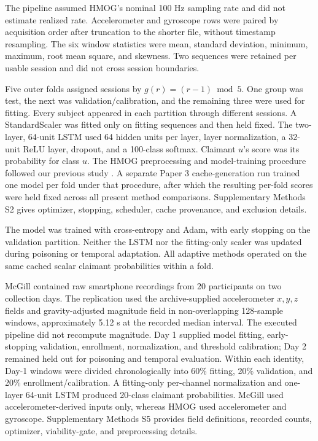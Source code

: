 \documentclass[technologies,article,submit,moreauthors]{Definitions/mdpi}
\begin{document}
The pipeline assumed HMOG's nominal 100 Hz sampling rate and did not estimate realized rate. Accelerometer and gyroscope rows were paired by acquisition order after truncation to the shorter file, without timestamp resampling. The six window statistics were mean, standard deviation, minimum, maximum, root mean square, and skewness. Two sequences were retained per usable session and did not cross session boundaries.

Five outer folds assigned sessions by \(g(r)=(r-1)\bmod5\). One group was test, the next was validation/calibration, and the remaining three were used for fitting. Every subject appeared in each partition through different sessions. A StandardScaler was fitted only on fitting sequences and then held fixed. The two-layer, 64-unit LSTM used 64 hidden units per layer, layer normalization, a 32-unit ReLU layer, dropout, and a 100-class softmax. Claimant \(u\)'s score was its probability for class \(u\). The HMOG preprocessing and model-training procedure followed our previous study \cite{Serbin2026AdaptiveLSTM}. A separate Paper 3 cache-generation run trained one model per fold under that procedure, after which the resulting per-fold scores were held fixed across all present method comparisons. Supplementary Methods S2 gives optimizer, stopping, scheduler, cache provenance, and exclusion details.

The model was trained with cross-entropy and Adam, with early stopping on the validation partition. Neither the LSTM nor the fitting-only scaler was updated during poisoning or temporal adaptation. All adaptive methods operated on the same cached scalar claimant probabilities within a fold.

McGill contained raw smartphone recordings from 20 participants on two collection days. The replication used the archive-supplied accelerometer \(x,y,z\) fields and gravity-adjusted magnitude field in non-overlapping 128-sample windows, approximately 5.12 s at the recorded median interval. The executed pipeline did not recompute magnitude. Day 1 supplied model fitting, early-stopping validation, enrollment, normalization, and threshold calibration; Day 2 remained held out for poisoning and temporal evaluation. Within each identity, Day-1 windows were divided chronologically into 60\% fitting, 20\% validation, and 20\% enrollment/calibration. A fitting-only per-channel normalization and one-layer 64-unit LSTM produced 20-class claimant probabilities. McGill used accelerometer-derived inputs only, whereas HMOG used accelerometer and gyroscope. Supplementary Methods S5 provides field definitions, recorded counts, optimizer, viability-gate, and preprocessing details.
\end{document}
